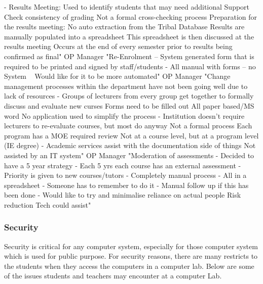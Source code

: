 - Results Meeting:
     Used to identify students that may need additional Support
     Check consistency of grading
     Not a formal cross-checking process
     Preparation for the results meeting:
       No auto extraction from the Tribal Database
       Results are manually populated into a spreadsheet
       This spreadsheet is then discussed at the results meeting
       Occurs at the end of every semester prior to results being confirmed as final"
OP Manager	"Re-Enrolment – System generated form that is required to be printed and signed by staff/students
- All manual with forms – no System
   Would like for it to be more automated"
OP Manager	"Change management processes within the department have not been going well due to lack of resources
  - Groups of lecturers from every group get together to formally discuss and evaluate new curses
      Forms need to be filled out
      All paper based/MS word
      No application used to simplify the process
  - Institution doesn’t require lecturers to re-evaluate courses, but most do anyway
      Not a formal process
      Each program has a MOE required review
      Not at a course level, but at a program level (IE degree)
  - Academic services assist with the documentation side of things
      Not assisted by an IT system"
OP Manager	"Moderation of assessments
  - Decided to have a 5 year strategy
  - Each 5 yrs each course has an external assessment
  - Priority is given to new courses/tutors
  - Completely manual process
  - All in a spreadsheet
  - Someone has to remember to do it
  - Manual follow up if this has been done
  - Would like to try and minimalise reliance on actual people 
      Risk reduction
      Tech could assist"


\subsubsection{Security} 
Security is critical for any computer system, especially for those computer system which is used for public  purpose. For security reasons, there are many restricts to the students when they access the computers in a computer lab. Below are some of the issues students and teachers may encounter at a computer Lab.

